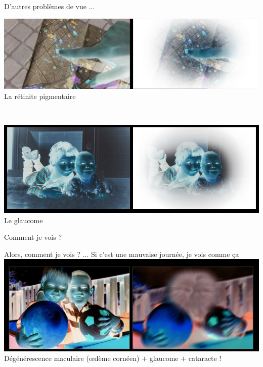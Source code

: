 \documentclass{beamer}
\begin{document}
\begin{frame}
 {D'autres problèmes de vue ... }

 \begin{center}
 \begin{minipage}{0.8\linewidth}
  \centering \includegraphics[width=1\linewidth]{images/visual_problem5_neg.png}
  La r\'etinite pigmentaire
  \pause
 \end{minipage} \\ \vskip 0.8cm
 \begin{minipage}{0.8\linewidth}
  \centering \includegraphics[width=1\linewidth]{images/visual_problem6_neg.png}
  Le glaucome
 \end{minipage}
 \end{center}

\end{frame}


\begin{frame}
 {Comment je vois ?}
 
 \vskip -0.4cm \small Alors, comment je vois ? ... Si c'est une mauvaise journ\'ee, je vois comme ça  \vskip 0.1cm
 \centering \includegraphics[width=0.75\linewidth]{images/visual_problem_neg.png}  \\
 D\'eg\'en\'erescence maculaire (œdème cornéen)
 \vskip 0.5cm \pause
 \centering $+$ glaucome $+$ cataracte ! 
  
\end{frame}
\end{document}
